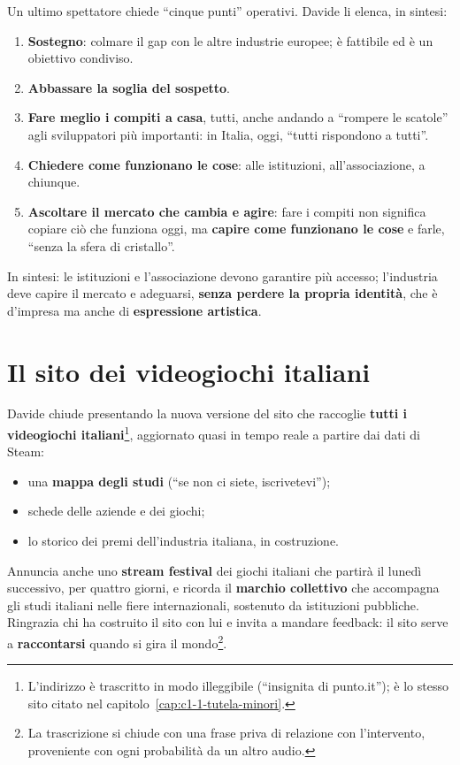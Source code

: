 Un ultimo spettatore chiede ``cinque punti'' operativi. Davide li elenca, in sintesi:
\begin{enumerate}
  \item \textbf{Sostegno}: colmare il gap con le altre industrie europee; è
        fattibile ed è un obiettivo condiviso.
  \item \textbf{Abbassare la soglia del sospetto}.
  \item \textbf{Fare meglio i compiti a casa}, tutti, anche andando a ``rompere le
        scatole'' agli sviluppatori più importanti: in Italia, oggi, ``tutti
        rispondono a tutti''.
  \item \textbf{Chiedere come funzionano le cose}: alle istituzioni, all'associazione,
        a chiunque.
  \item \textbf{Ascoltare il mercato che cambia e agire}: fare i compiti non
        significa copiare ciò che funziona oggi, ma \textbf{capire come funzionano
        le cose} e farle, ``senza la sfera di cristallo''.
\end{enumerate}
In sintesi: le istituzioni e l'associazione devono garantire più accesso; l'industria
deve capire il mercato e adeguarsi, \textbf{senza perdere la propria identità}, che
è d'impresa ma anche di \textbf{espressione artistica}.

\section{Il sito dei videogiochi italiani}
\label{sec:c2-3-sito}

Davide chiude presentando la nuova versione del sito che raccoglie
\textbf{tutti i videogiochi italiani}\footnote{L'indirizzo è trascritto in modo
illeggibile (``insignita di punto.it''); è lo stesso sito citato nel
capitolo~\ref{cap:c1-1-tutela-minori}.}, aggiornato quasi in tempo reale a partire
dai dati di Steam:
\begin{itemize}
  \item una \textbf{mappa degli studi} (``se non ci siete, iscrivetevi'');
  \item schede delle aziende e dei giochi;
  \item lo storico dei premi dell'industria italiana, in costruzione.
\end{itemize}
Annuncia anche uno \textbf{stream festival} dei giochi italiani che partirà il
lunedì successivo, per quattro giorni, e ricorda il \textbf{marchio collettivo} che
accompagna gli studi italiani nelle fiere internazionali, sostenuto da istituzioni
pubbliche. Ringrazia chi ha costruito il sito con lui e invita a mandare feedback:
il sito serve a \textbf{raccontarsi} quando si gira il mondo\footnote{La
trascrizione si chiude con una frase priva di relazione con l'intervento,
proveniente con ogni probabilità da un altro audio.}.

